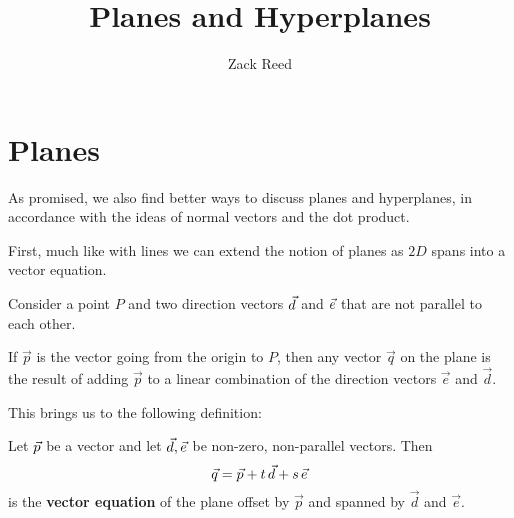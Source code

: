 \documentclass{ximera}
\author{Zack Reed}
\title{Planes and Hyperplanes}
\begin{document}
\begin{abstract}


\end{abstract}
\maketitle



\section*{Planes}
\label{sec:planes}

As promised, we also find better ways to discuss planes and hyperplanes, in accordance with the ideas of normal vectors and the dot product.

First, much like with lines we can extend the notion of planes as $2D$ spans into a vector equation. 

Consider a point $P$ and two direction
vectors $\vec{d}$ and $\vec{e}$ that are not parallel to each
other. 

If $\vec{p}$ is the vector going from the origin to $P$, then any vector $\vec{q}$ on the plane is the result of adding $\vec{p}$ to a linear combination of the direction vectors $\vec{e}$ and $\vec{d}$.

\begin{center}
\end{center}

This brings us to the following definition: 


\begin{definition}\label{def:vector-equation-of-plane}

  Let $\vec{p}$ be a vector and let $\vec{d},\vec{e}$ be non-zero,
  non-parallel vectors. Then
  \begin{equation*}
    \vec{q} = \vec{p} + t\,\vec{d} + s\,\vec{e}
  \end{equation*}
  is the \textbf{vector equation} of the plane offset by $\vec{p}$ and spanned by $\vec{d}$ and $\vec{e}$.
\end{definition}
\end{document}
